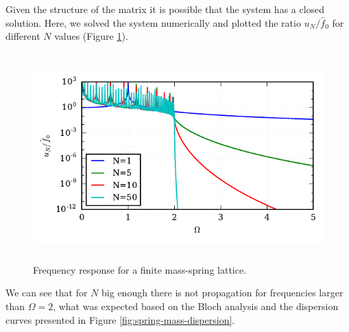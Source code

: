 \documentclass[12pt]{article}
\begin{document}
Given the structure of the matrix it is possible that the system has a closed solution. Here, we solved the system numerically and plotted the ratio $u_N/\hat{f}_0$ for different $N$ values (Figure \ref{fig:single-finite}).
\begin{figure}[h]
\centering
\includegraphics[height=8cm]{img/single_finite.pdf} 
\caption{Frequency response for a finite mass-spring lattice.}\label{fig:single-finite}
\end{figure}

We can see that for $N$ big enough there is not propagation for frequencies larger than $\Omega=2$, what was expected based on the Bloch analysis and the dispersion curves presented in Figure \ref{fig:spring-mass-dispersion}.


\end{document}
